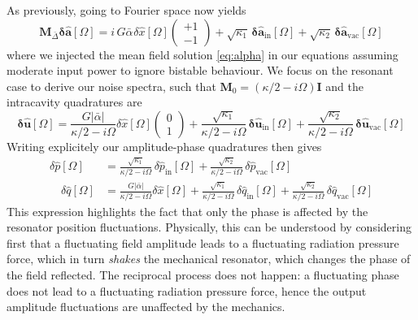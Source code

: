 As previously, going to Fourier space now yields 
\begin{equation}
     \mathbf{M}_{\bar\Delta} \mathbf{\delta \hat{a}}[\Omega]  = i \,  G \bar{\alpha}_{\mathrm{}} \delta \hat{x}[\Omega]   \begin{pmatrix} +1 \\ -1\end{pmatrix}  +\sqrt{\kappa_{\mathrm{1}}} \, \mathbf{\delta \hat{a}_{\mathrm{in}}}[\Omega]  + \sqrt{\kappa_2} \, \mathbf{\delta \hat{a}_{\mathrm{vac}}}[\Omega] 
\end{equation}
where we injected the mean field solution \eqref{eq:alpha} in our equations assuming moderate input power to ignore bistable behaviour. We focus on the resonant case to derive our noise spectra, such that $\mathbf{M}_0 = (\kappa/2 - i\Omega) \mathbf{I}$  and the intracavity quadratures are
\begin{equation}
  \mathbf{\delta \hat{u}}[\Omega] =  \frac{G|\bar \alpha|}{\kappa/2 - i\Omega}\delta \hat{x}[\Omega] \begin{pmatrix} 0\\ 1\end{pmatrix}  +\frac{\sqrt{\kappa_{\mathrm{1}}}}{\kappa/2 - i\Omega} \, \mathbf{\delta \hat{u}_{\mathrm{in}}}[\Omega]  +\frac{\sqrt{\kappa_{\mathrm{2}}}}{\kappa/2 - i\Omega} \, \mathbf{\delta \hat{u}_{\mathrm{vac}}}[\Omega]  
\end{equation}
Writing explicitely our amplitude-phase quadratures then gives 
\begin{equation}
  \begin{split}
    \delta \hat{p}[\Omega] &= \frac{\sqrt{\kappa_{\mathrm{1}}}}{\kappa/2 - i\Omega} \, \delta \hat{p}_{\mathrm{in}}[\Omega] + \frac{\sqrt{\kappa_{\mathrm{2}}}}{\kappa/2 - i\Omega} \, \delta \hat{p}_{\mathrm{vac}}[\Omega] \\
    \quad \delta \hat{q}[\Omega] &=  \frac{G|\bar \alpha|}{\kappa/2 - i\Omega}\delta \hat{x}[\Omega]  +\frac{\sqrt{\kappa_{\mathrm{1}}}}{\kappa/2 - i\Omega} \, \delta \hat{q}_{\mathrm{in}}[\Omega]  + \frac{\sqrt{\kappa_{\mathrm{2}}}}{\kappa/2 - i\Omega} \, \delta \hat{q}_{\mathrm{vac}}[\Omega] 
  \end{split}
\end{equation}
This expression highlights the fact that only the phase is affected by the resonator position fluctuations. Physically, this can be understood by considering first that a fluctuating field amplitude leads to a fluctuating radiation pressure force, which in turn \textit{shakes} the mechanical resonator, which changes the phase of the field reflected. The reciprocal process does not happen: a fluctuating phase does not lead to a fluctuating radiation pressure force, hence the output amplitude fluctuations are unaffected by the mechanics.
